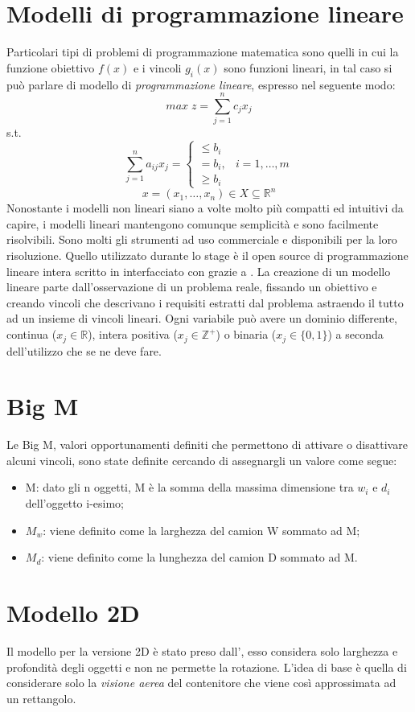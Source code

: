 \section{Modelli di programmazione lineare}
Particolari tipi di problemi di programmazione matematica sono quelli in cui la funzione obiettivo $f(x)$ e i vincoli $g_i(x)$ sono funzioni lineari, in tal caso si può parlare di modello di \textit{programmazione lineare}, espresso nel seguente modo:
$$ max\; z = \sum_{j=1}^n c_j x_j $$
s.t.
$$\sum_{j=1}^n a_{ij} x_j = \begin{cases} \leq b_i \\ = b_i, & i = 1,\dots,m \\ \geq b_i \end{cases}$$
$$x = (x_1,\dots,x_n) \in X \subseteq \mathbb{R}^n$$
Nonostante i modelli non lineari siano a volte molto più compatti ed intuitivi da capire, i modelli lineari mantengono comunque semplicità e sono facilmente risolvibili. Sono molti gli strumenti ad uso commerciale e  disponibili per la loro risoluzione. Quello utilizzato durante lo stage è il  open source di programmazione lineare intera  scritto in  interfacciato con  grazie a . La creazione di un modello lineare parte dall'osservazione di un problema reale, fissando un obiettivo e creando vincoli che descrivano i requisiti estratti dal problema astraendo il tutto ad un insieme di vincoli lineari.
Ogni variabile può avere un dominio differente, continua ($x_j \in \mathbb{R}$), intera positiva ($x_j \in \mathbb{Z}^+$) o binaria ($x_j \in \{0,1\}$) a seconda dell'utilizzo che se ne deve fare.
\section{Big M}
Le Big M, valori opportunamenti definiti che permettono di attivare o disattivare alcuni vincoli, sono state definite cercando di assegnargli un valore come segue:
\begin{itemize}
	\item M: dato gli n oggetti, M è la somma della massima dimensione tra $w_i$ e $d_i$ dell'oggetto i-esimo;
	\item $M_w$: viene definito come la larghezza del camion W sommato ad M;
	\item $M_d$: viene definito come la lunghezza del camion D sommato ad M.
\end{itemize}

\section{Modello 2D}
Il modello per la versione 2D è stato preso dall', esso considera solo larghezza e profondità degli oggetti e non ne permette la rotazione. L'idea di base è quella di considerare solo la \textit{visione aerea} del contenitore che viene così approssimata ad un rettangolo.

